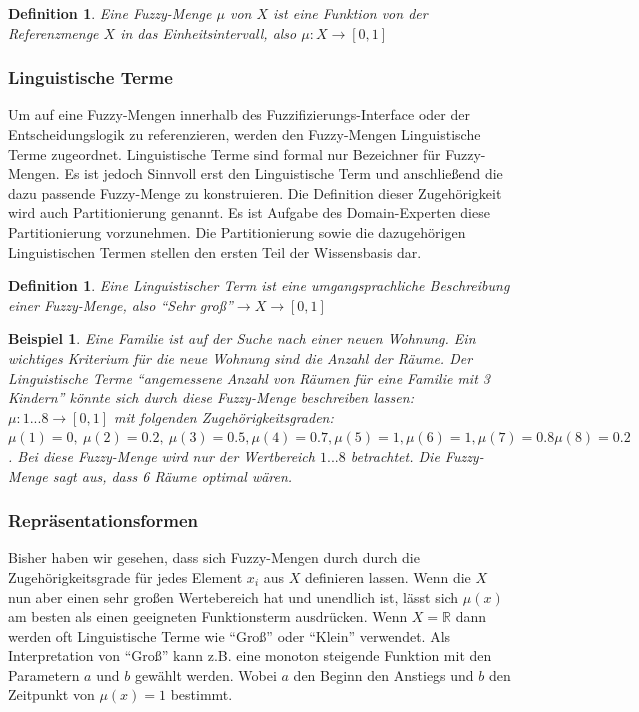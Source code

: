 \documentclass[12pt,a4paper,bibliography=totocnumbered,listof=totocnumbered]{scrartcl}
\theoremstyle{Umgebung}
\begin{document}
\newtheorem{fuzzymenge}{Definition}
\begin{fuzzymenge}
Eine Fuzzy-Menge $\mu$ von $X$ ist eine Funktion von der Referenzmenge
$X$ in das Einheitsintervall, also $\mu : X \rightarrow \left [0,1\right]$
\end{fuzzymenge}

\subsubsection{Linguistische Terme}

Um auf eine Fuzzy-Mengen innerhalb des Fuzzifizierungs-Interface oder der Entscheidungslogik zu referenzieren, werden den Fuzzy-Mengen Linguistische Terme zugeordnet. Linguistische Terme sind formal nur Bezeichner für Fuzzy-Mengen. Es ist jedoch Sinnvoll erst den Linguistische Term und anschließend die dazu passende Fuzzy-Menge zu konstruieren. Die Definition dieser Zugehörigkeit wird auch Partitionierung genannt. Es ist Aufgabe des Domain-Experten diese Partitionierung vorzunehmen. Die Partitionierung sowie die dazugehörigen Linguistischen Termen stellen den ersten Teil der Wissensbasis dar.

\newtheorem{fuzzyterm}{Definition}
\begin{fuzzyterm}
Eine Linguistischer Term ist eine umgangsprachliche Beschreibung einer Fuzzy-Menge, also \enquote{Sehr groß}$\rightarrow X \rightarrow \left[0,1\right]$
\end{fuzzyterm}

\newtheorem{Bsp}{Beispiel}
\begin{Bsp} 
Eine Familie ist auf der Suche nach einer neuen Wohnung. Ein wichtiges Kriterium für die neue Wohnung sind die Anzahl der Räume. Der Linguistische Terme \enquote{angemessene Anzahl von Räumen für eine Familie mit 3 Kindern} könnte sich durch diese Fuzzy-Menge beschreiben lassen: $\mu: {1...8} \rightarrow  \left[0,1\right]$ mit folgenden Zugehörigkeitsgraden: $\mu(1) = 0,\:\mu(2) = 0.2,\:\mu(3) = 0.5, \mu(4) = 0.7,\mu(5) = 1, \mu(6) = 1, \mu(7) = 0.8
\mu(8) = 0.2$. Bei diese Fuzzy-Menge wird nur der Wertbereich $1...8$ betrachtet. Die Fuzzy-Menge sagt aus, dass 6 Räume optimal wären.
\end{Bsp} 

\label{representationsformen}
\subsubsection{Repräsentationsformen}

Bisher haben wir gesehen, dass sich Fuzzy-Mengen durch durch die Zugehörigkeitsgrade für jedes Element $x_i$ aus $X$ definieren lassen. Wenn die $X$ nun aber einen sehr großen Wertebereich hat und unendlich ist, lässt sich $\mu(x)$ am besten als einen geeigneten Funktionsterm ausdrücken. Wenn $X = \mathbb{R}$ dann werden oft Linguistische Terme wie \enquote{Groß} oder \enquote{Klein} verwendet. Als Interpretation von \enquote{Groß} kann z.B. eine monoton steigende Funktion mit den Parametern $a$ und $b$ gewählt werden. Wobei $a$ den Beginn den Anstiegs und $b$ den Zeitpunkt von $\mu(x) = 1$ bestimmt.
\end{document}
